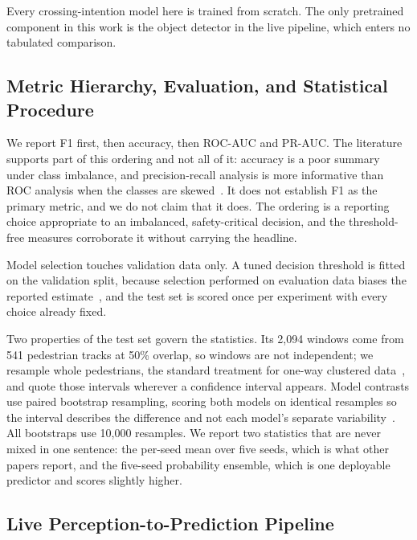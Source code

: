 \documentclass[mti,article,submit,moreauthors]{Definitions/mdpi}
\begin{document}
Every crossing-intention model here is trained from scratch. The only pretrained component in this work is the object detector in the live pipeline, which enters no tabulated comparison.

\subsection{Metric Hierarchy, Evaluation, and Statistical Procedure}

We report F1 first, then accuracy, then ROC-AUC and PR-AUC. The literature supports part of this ordering and not all of it: accuracy is a poor summary under class imbalance, and precision-recall analysis is more informative than ROC analysis when the classes are skewed~\citep{davis2006precision,saito2015precision}. It does not establish F1 as the primary metric, and we do not claim that it does. The ordering is a reporting choice appropriate to an imbalanced, safety-critical decision, and the threshold-free measures corroborate it without carrying the headline.

Model selection touches validation data only. A tuned decision threshold is fitted on the validation split, because selection performed on evaluation data biases the reported estimate~\citep{cawley2010overfitting}, and the test set is scored once per experiment with every choice already fixed.

Two properties of the test set govern the statistics. Its 2,094 windows come from 541 pedestrian tracks at 50\% overlap, so windows are not independent; we resample whole pedestrians, the standard treatment for one-way clustered data~\citep{fieldwelsh2007}, and quote those intervals wherever a confidence interval appears. Model contrasts use paired bootstrap resampling, scoring both models on identical resamples so the interval describes the difference and not each model's separate variability~\citep{koehn2004significance}. All bootstraps use 10,000 resamples. We report two statistics that are never mixed in one sentence: the per-seed mean over five seeds, which is what other papers report, and the five-seed probability ensemble, which is one deployable predictor and scores slightly higher.

\subsection{Live Perception-to-Prediction Pipeline}
\end{document}
